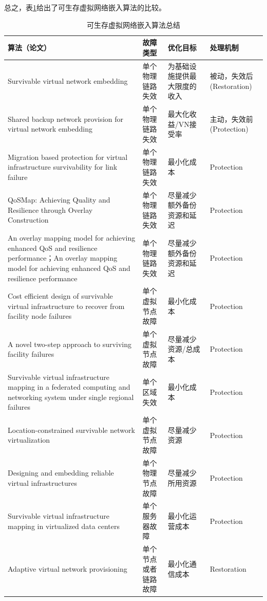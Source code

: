 总之，表\ref{tab:survivableVirtualNetworkEmbedd}给出了可生存虚拟网络嵌入算法的比较。
\begin{table}[htbp]
\caption{可生存虚拟网络嵌入算法总结}\label{tab:survivableVirtualNetworkEmbedd}
\vspace{0.5em}\centering\wuhao
\begin{tabularx}{48em}{|*{4}{>{\centering\arraybackslash}X|}}
\toprule[1.5pt]
算法（论文）   & 故障类型  & 优化目标 & 处理机制  \\
\midrule[1pt]
Survivable virtual network embedding\cite{rahman2013svne} & 单个物理链路失效 & 为基础设施提供最大限度的收入 & 被动，失效后(Restoration)\\
\hline
Shared backup network provision for virtual network embedding\cite{guo2011shared} & 单个物理链路失效 & 最大化收益/VN接受率& 主动，失效前(Protection)\\
\hline
Migration based protection for virtual infrastructure survivability for link failure\cite{yu2011migration} & 单个物理链路失效 & 最小化成本 & Protection\\
\hline
QoSMap: Achieving Quality and Resilience through Overlay Construction\cite{shamsi2009qosmap} & 单个物理链路失效 & 尽量减少额外备份资源和延迟 & Protection\\
\hline
An overlay mapping model for achieving enhanced QoS and resilience performance\cite{zhang2011overlay}；An overlay mapping model for achieving enhanced QoS and resilience performance\cite{zhang2011overlay} & 单个物理链路失效 & 尽量减少额外备份资源和延迟 & Protection\\
\hline
Cost efficient design of survivable virtual infrastructure to recover from facility node failures\cite{yu2011cost} & 单个虚拟节点故障& 最小化成本 & Protection\\
\hline
A novel two-step approach to surviving facility failures\cite{qiao2011novel} & 单个虚拟节点故障 & 尽量减少资源/总成本 & Protection\\
\hline
Survivable virtual infrastructure mapping in a federated computing and networking system under single regional failures\cite{yu2010survivable} & 单个区域失效 & 最小化成本 & Protection \\
\hline
Location-constrained survivable network virtualization\cite{hu2012location} & 单个虚拟节点故障 & 尽量减少资源 & Protection\\
\hline
Designing and embedding reliable virtual infrastructures\cite{yeow2010designing} & 单个物理节点故障 & 尽量减少所用资源 & Protection\\
\hline
Survivable virtual infrastructure mapping in virtualized data centers\cite{xu2012survivable} & 单个服务器故障 & 最小化运营成本& Protection\\
\hline
Adaptive virtual network provisioning\cite{houidi2010adaptive} & 单个节点或者链路故障 & 最小化通信成本 & Restoration\\
\bottomrule[1.5pt]
\end{tabularx}
\vspace{\baselineskip}
\end{table}

